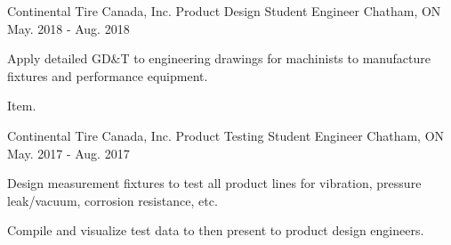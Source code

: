 \begin{cventries}

  \cventry
  {Continental Tire Canada, Inc.} %
  {Product Design Student Engineer} %
    {Chatham, ON} %
    {May. 2018 - Aug. 2018} %
    {
      \begin{cvitems} %
        \item{Apply detailed GD\&T to engineering drawings for machinists to manufacture fixtures and performance equipment.}
        \item{Item.}
      \end{cvitems}
    }
    

  \cventry
  {Continental Tire Canada, Inc.} %
  {Product Testing Student Engineer} %
    {Chatham, ON} %
    {May. 2017 - Aug. 2017} %
    {
      \begin{cvitems} %
        \item {Design measurement fixtures to test all product lines for vibration, pressure leak/vacuum, corrosion resistance, etc.}
        \item {Compile and visualize test data to then present to product design engineers.}
      \end{cvitems}
    }
    
\end{cventries}
